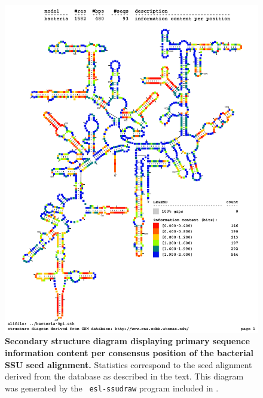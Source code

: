 \begin{figure}
\begin{center}
\includegraphics[width=5.5in]{../../seeds/ss-diagrams/bacteria-0p1-info}
\end{center}
\caption[Secondary structure diagram displaying primary sequence
  information content per consensus position of the bacterial SSU seed
  alignment]{\textbf{Secondary structure diagram displaying primary
  sequence information content per consensus position of the bacterial SSU seed
  alignment.} Statistics correspond to the  seed
  alignment derived from the  database \cite{CannoneGutell02}
  as described in the text. This diagram was generated by the {\tt
  esl-ssudraw} program included in .}
\label{fig:bacinfo}
\end{figure}


